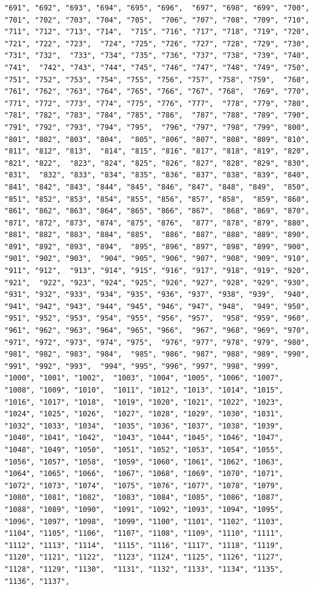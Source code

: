 \documentclass[
]{article}
\begin{document}
\begin{verbatim}
"691", "692", "693", "694", "695", "696",  "697", "698", "699", "700", "701", "702", "703", "704", "705",  "706", "707", "708", "709", "710", "711", "712", "713", "714",  "715", "716", "717", "718", "719", "720", "721", "722", "723",  "724", "725", "726", "727", "728", "729", "730", "731", "732",  "733", "734", "735", "736", "737", "738", "739", "740", "741",  "742", "743", "744", "745", "746", "747", "748", "749", "750",  "751", "752", "753", "754", "755", "756", "757", "758", "759",  "760", "761", "762", "763", "764", "765", "766", "767", "768",  "769", "770", "771", "772", "773", "774", "775", "776", "777",  "778", "779", "780", "781", "782", "783", "784", "785", "786",  "787", "788", "789", "790", "791", "792", "793", "794", "795",  "796", "797", "798", "799", "800", "801", "802", "803", "804",  "805", "806", "807", "808", "809", "810", "811", "812", "813",  "814", "815", "816", "817", "818", "819", "820", "821", "822",  "823", "824", "825", "826", "827", "828", "829", "830", "831",  "832", "833", "834", "835", "836", "837", "838", "839", "840",  "841", "842", "843", "844", "845", "846", "847", "848", "849",  "850", "851", "852", "853", "854", "855", "856", "857", "858",  "859", "860", "861", "862", "863", "864", "865", "866", "867",  "868", "869", "870", "871", "872", "873", "874", "875", "876",  "877", "878", "879", "880", "881", "882", "883", "884", "885",  "886", "887", "888", "889", "890", "891", "892", "893", "894",  "895", "896", "897", "898", "899", "900", "901", "902", "903",  "904", "905", "906", "907", "908", "909", "910", "911", "912",  "913", "914", "915", "916", "917", "918", "919", "920", "921",  "922", "923", "924", "925", "926", "927", "928", "929", "930",  "931", "932", "933", "934", "935", "936", "937", "938", "939",  "940", "941", "942", "943", "944", "945", "946", "947", "948",  "949", "950", "951", "952", "953", "954", "955", "956", "957",  "958", "959", "960", "961", "962", "963", "964", "965", "966",  "967", "968", "969", "970", "971", "972", "973", "974", "975",  "976", "977", "978", "979", "980", "981", "982", "983", "984",  "985", "986", "987", "988", "989", "990", "991", "992", "993",  "994", "995", "996", "997", "998", "999", "1000", "1001", "1002",  "1003", "1004", "1005", "1006", "1007", "1008", "1009", "1010",  "1011", "1012", "1013", "1014", "1015", "1016", "1017", "1018",  "1019", "1020", "1021", "1022", "1023", "1024", "1025", "1026",  "1027", "1028", "1029", "1030", "1031", "1032", "1033", "1034",  "1035", "1036", "1037", "1038", "1039", "1040", "1041", "1042",  "1043", "1044", "1045", "1046", "1047", "1048", "1049", "1050",  "1051", "1052", "1053", "1054", "1055", "1056", "1057", "1058",  "1059", "1060", "1061", "1062", "1063", "1064", "1065", "1066",  "1067", "1068", "1069", "1070", "1071", "1072", "1073", "1074",  "1075", "1076", "1077", "1078", "1079", "1080", "1081", "1082",  "1083", "1084", "1085", "1086", "1087", "1088", "1089", "1090",  "1091", "1092", "1093", "1094", "1095", "1096", "1097", "1098",  "1099", "1100", "1101", "1102", "1103", "1104", "1105", "1106",  "1107", "1108", "1109", "1110", "1111", "1112", "1113", "1114",  "1115", "1116", "1117", "1118", "1119", "1120", "1121", "1122",  "1123", "1124", "1125", "1126", "1127", "1128", "1129", "1130",  "1131", "1132", "1133", "1134", "1135", "1136", "1137", 
\end{verbatim}
\end{document}
